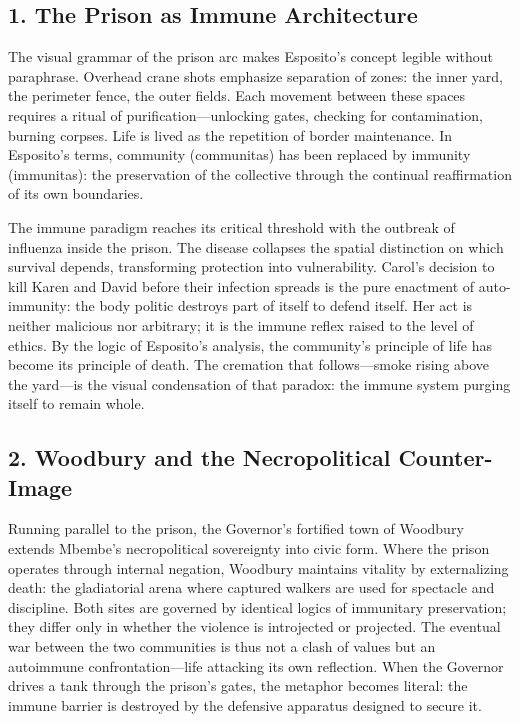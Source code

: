 \documentclass[11pt]{article}
\begin{document}
\subsection*{1. The Prison as Immune Architecture}
\label{sec:org675b59e}

The visual grammar of the prison arc makes Esposito’s concept legible without paraphrase.  Overhead crane shots emphasize separation of zones: the inner yard, the perimeter fence, the outer fields.  Each movement between these spaces requires a ritual of purification—unlocking gates, checking for contamination, burning corpses.  Life is lived as the repetition of border maintenance.  In Esposito’s terms, community (communitas) has been replaced by immunity (immunitas): the preservation of the collective through the continual reaffirmation of its own boundaries.  

The immune paradigm reaches its critical threshold with the outbreak of influenza inside the prison.  The disease collapses the spatial distinction on which survival depends, transforming protection into vulnerability.  Carol’s decision to kill Karen and David before their infection spreads is the pure enactment of auto-immunity: the body politic destroys part of itself to defend itself.  Her act is neither malicious nor arbitrary; it is the immune reflex raised to the level of ethics.  By the logic of Esposito’s analysis, the community’s principle of life has become its principle of death.  The cremation that follows—smoke rising above the yard—is the visual condensation of that paradox: the immune system purging itself to remain whole.
\subsection*{2. Woodbury and the Necropolitical Counter-Image}
\label{sec:org11fb380}

Running parallel to the prison, the Governor’s fortified town of Woodbury extends Mbembe’s necropolitical sovereignty into civic form.  Where the prison operates through internal negation, Woodbury maintains vitality by externalizing death: the gladiatorial arena where captured walkers are used for spectacle and discipline.  Both sites are governed by identical logics of immunitary preservation; they differ only in whether the violence is introjected or projected.  The eventual war between the two communities is thus not a clash of values but an autoimmune confrontation—life attacking its own reflection.  When the Governor drives a tank through the prison’s gates, the metaphor becomes literal: the immune barrier is destroyed by the defensive apparatus designed to secure it.  
\end{document}
